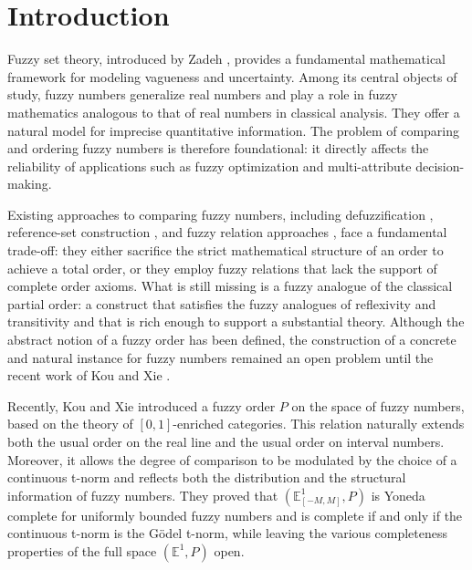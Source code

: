 \documentclass[preprint,3p,times]{elsarticle}
\theoremstyle{plain}
\theoremstyle{definition}
\numberwithin{equation}{section}
\begin{document}
\section{Introduction}
Fuzzy set theory, introduced by Zadeh \cite{ZADEH1965338}, provides a fundamental mathematical framework for modeling vagueness and uncertainty. Among its central objects of study, fuzzy numbers generalize real numbers and play a role in fuzzy mathematics analogous to that of real numbers in classical analysis.   They offer a natural model for imprecise quantitative information. The problem of comparing and ordering fuzzy numbers is therefore foundational: it directly affects the reliability of applications such as fuzzy optimization and multi-attribute decision-making.
 
 Existing approaches to comparing fuzzy numbers, including defuzzification \cite{BORTOLAN19851,CHU2002111,KaufmannGupta1985}, reference-set construction \cite{CHEN1985113,jain1976decision,jain1977procedure}, and fuzzy relation approaches \cite{wang1997comparative,wang1996classification}, face a fundamental trade-off: they either sacrifice the strict mathematical structure of an order to achieve a total order, or they employ fuzzy relations that lack the support of complete order axioms. What is still missing is a fuzzy analogue of the classical partial order: a construct that satisfies the fuzzy analogues of reflexivity and transitivity and that is rich enough to support a substantial theory. Although the abstract notion of a fuzzy order has been defined, the construction of a concrete and natural instance for fuzzy numbers remained an open problem until the recent work of Kou and Xie \cite{kouhui}.

Recently, Kou and Xie introduced a fuzzy order \(P\) on the space of fuzzy numbers, based on the theory of \([0,1]\)-enriched categories. This relation naturally extends both the usual order on the real line and the usual order on interval numbers. Moreover, it allows the degree of comparison to be modulated by the choice of a continuous t-norm and reflects both the distribution and the structural information of fuzzy numbers. They proved that \((\mathbb{E}^1_{[-M,M]},P)\) is Yoneda complete for uniformly bounded fuzzy numbers and is complete if and only if the continuous t-norm is the G\"odel t-norm, while leaving the various completeness properties of the full space \((\mathbb{E}^1,P)\) open.
\end{document}

